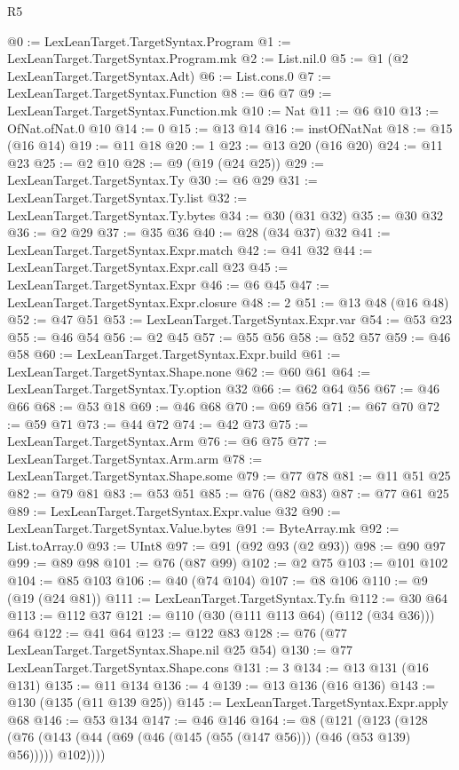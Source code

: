 \begin{lexlean}{R5}
\begin{coremodule}
@0 := LexLeanTarget.TargetSyntax.Program
@1 := LexLeanTarget.TargetSyntax.Program.mk
@2 := List.nil.{0}
@5 := @1 (@2 LexLeanTarget.TargetSyntax.Adt)
@6 := List.cons.{0}
@7 := LexLeanTarget.TargetSyntax.Function
@8 := @6 @7
@9 := LexLeanTarget.TargetSyntax.Function.mk
@10 := Nat
@11 := @6 @10
@13 := OfNat.ofNat.{0} @10
@14 := 0
@15 := @13 @14
@16 := instOfNatNat
@18 := @15 (@16 @14)
@19 := @11 @18
@20 := 1
@23 := @13 @20 (@16 @20)
@24 := @11 @23
@25 := @2 @10
@28 := @9 (@19 (@24 @25))
@29 := LexLeanTarget.TargetSyntax.Ty
@30 := @6 @29
@31 := LexLeanTarget.TargetSyntax.Ty.list
@32 := LexLeanTarget.TargetSyntax.Ty.bytes
@34 := @30 (@31 @32)
@35 := @30 @32
@36 := @2 @29
@37 := @35 @36
@40 := @28 (@34 @37) @32
@41 := LexLeanTarget.TargetSyntax.Expr.match
@42 := @41 @32
@44 := LexLeanTarget.TargetSyntax.Expr.call @23
@45 := LexLeanTarget.TargetSyntax.Expr
@46 := @6 @45
@47 := LexLeanTarget.TargetSyntax.Expr.closure
@48 := 2
@51 := @13 @48 (@16 @48)
@52 := @47 @51
@53 := LexLeanTarget.TargetSyntax.Expr.var
@54 := @53 @23
@55 := @46 @54
@56 := @2 @45
@57 := @55 @56
@58 := @52 @57
@59 := @46 @58
@60 := LexLeanTarget.TargetSyntax.Expr.build
@61 := LexLeanTarget.TargetSyntax.Shape.none
@62 := @60 @61
@64 := LexLeanTarget.TargetSyntax.Ty.option @32
@66 := @62 @64 @56
@67 := @46 @66
@68 := @53 @18
@69 := @46 @68
@70 := @69 @56
@71 := @67 @70
@72 := @59 @71
@73 := @44 @72
@74 := @42 @73
@75 := LexLeanTarget.TargetSyntax.Arm
@76 := @6 @75
@77 := LexLeanTarget.TargetSyntax.Arm.arm
@78 := LexLeanTarget.TargetSyntax.Shape.some
@79 := @77 @78
@81 := @11 @51 @25
@82 := @79 @81
@83 := @53 @51
@85 := @76 (@82 @83)
@87 := @77 @61 @25
@89 := LexLeanTarget.TargetSyntax.Expr.value @32
@90 := LexLeanTarget.TargetSyntax.Value.bytes
@91 := ByteArray.mk
@92 := List.toArray.{0}
@93 := UInt8
@97 := @91 (@92 @93 (@2 @93))
@98 := @90 @97
@99 := @89 @98
@101 := @76 (@87 @99)
@102 := @2 @75
@103 := @101 @102
@104 := @85 @103
@106 := @40 (@74 @104)
@107 := @8 @106
@110 := @9 (@19 (@24 @81))
@111 := LexLeanTarget.TargetSyntax.Ty.fn
@112 := @30 @64
@113 := @112 @37
@121 := @110 (@30 (@111 @113 @64) (@112 (@34 @36))) @64
@122 := @41 @64
@123 := @122 @83
@128 := @76 (@77 LexLeanTarget.TargetSyntax.Shape.nil @25 @54)
@130 := @77 LexLeanTarget.TargetSyntax.Shape.cons
@131 := 3
@134 := @13 @131 (@16 @131)
@135 := @11 @134
@136 := 4
@139 := @13 @136 (@16 @136)
@143 := @130 (@135 (@11 @139 @25))
@145 := LexLeanTarget.TargetSyntax.Expr.apply @68
@146 := @53 @134
@147 := @46 @146
@164 := @8
    (@121
      (@123
        (@128 (@76 (@143 (@44 (@69 (@46 (@145 (@55 (@147 @56))) (@46 (@53 @139) @56))))) @102))))

\end{coremodule}
\end{lexlean}

